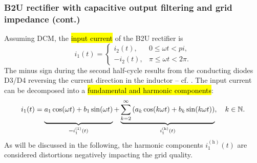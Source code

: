 \begin{frame}
    \frametitle{B2U rectifier with capacitive output filtering and grid impedance (cont.)}
    Assuming DCM, the \hl{input current} of the B2U rectifier is
    \begin{equation}
        i_1(t) = \begin{cases}
            i_2(t), & 0 \leq \omega t < pi,\\
            -i_2(t), & \pi \leq \omega t < 2\pi.
        \end{cases}
    \end{equation}
    The minus sign during the second half-cycle results from the conducting diodes D3/D4 reversing the current direction in the inductor -- cf. . The input current can be decomposed into a \hl{fundamental and harmonic components}:
    \begin{equation}
        i_1(t) = \underbrace{a_1 \cos(\omega t) + b_1 \sin(\omega t)\vphantom{\sum_{k=2}^{\infty}}}_{=i_1^{(1)}(t)} + \underbrace{\sum_{k=2}^{\infty} \left( a_k \cos(k\omega t) + b_k \sin(k\omega t) \right)}_{i_1^{(\mathrm{h})}(t)}, \quad k\in \mathbb{N}.
    \end{equation}
    As will be discussed in the following, the harmonic components $i_1^{(\mathrm{h})}(t)$ are considered distortions negatively impacting the grid quality.
\end{frame}


